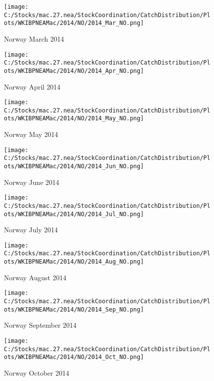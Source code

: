 \documentclass{article}
\begin{document}
\begin{figure}
	\centering
		\texttt{[image: C:/Stocks/mac.27.nea/StockCoordination/CatchDistribution/Plots/WKIBPNEAMac/2014/NO/2014\_Mar\_NO.png]}
	\caption{Norway March 2014}
	\label{fig:2014_Mar_NO}
\end{figure}

\begin{figure}
	\centering
		\texttt{[image: C:/Stocks/mac.27.nea/StockCoordination/CatchDistribution/Plots/WKIBPNEAMac/2014/NO/2014\_Apr\_NO.png]}
	\caption{Norway April 2014}
	\label{fig:2014_Apr_NO}
\end{figure}

\begin{figure}
	\centering
		\texttt{[image: C:/Stocks/mac.27.nea/StockCoordination/CatchDistribution/Plots/WKIBPNEAMac/2014/NO/2014\_May\_NO.png]}
	\caption{Norway May 2014}
	\label{fig:2014_May_NO}
\end{figure}

\begin{figure}
	\centering
		\texttt{[image: C:/Stocks/mac.27.nea/StockCoordination/CatchDistribution/Plots/WKIBPNEAMac/2014/NO/2014\_Jun\_NO.png]}
	\caption{Norway June 2014}
	\label{fig:2014_Jun_NO}
\end{figure}

\begin{figure}
	\centering
		\texttt{[image: C:/Stocks/mac.27.nea/StockCoordination/CatchDistribution/Plots/WKIBPNEAMac/2014/NO/2014\_Jul\_NO.png]}
	\caption{Norway July 2014}
	\label{fig:2014_Jul_NO}
\end{figure}

\begin{figure}
	\centering
		\texttt{[image: C:/Stocks/mac.27.nea/StockCoordination/CatchDistribution/Plots/WKIBPNEAMac/2014/NO/2014\_Aug\_NO.png]}
	\caption{Norway August 2014}
	\label{fig:2014_Aug_NO}
\end{figure}

\begin{figure}
	\centering
		\texttt{[image: C:/Stocks/mac.27.nea/StockCoordination/CatchDistribution/Plots/WKIBPNEAMac/2014/NO/2014\_Sep\_NO.png]}
	\caption{Norway September 2014}
	\label{fig:2014_Sep_NO}
\end{figure}

\begin{figure}
	\centering
		\texttt{[image: C:/Stocks/mac.27.nea/StockCoordination/CatchDistribution/Plots/WKIBPNEAMac/2014/NO/2014\_Oct\_NO.png]}
	\caption{Norway October 2014}
	\label{fig:2014_Oct_NO}
\end{figure}
\end{document}
